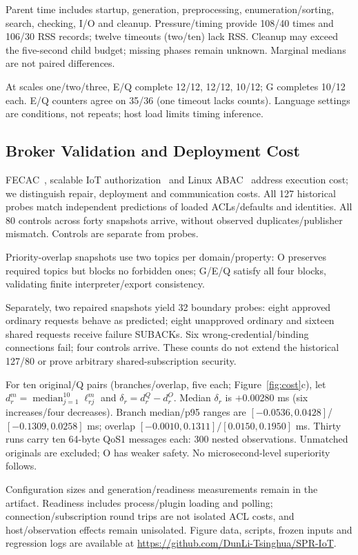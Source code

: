 \documentclass[letterpaper,journal]{IEEEtran}
\begin{document}
Parent time includes startup, generation, preprocessing, enumeration/sorting, search, checking, I/O and cleanup. Pressure/timing provide 108/40 times and 106/30 RSS records; twelve timeouts (two/ten) lack RSS. Cleanup may exceed the five-second child budget; missing phases remain unknown. Marginal medians are not paired differences.

At scales one/two/three, E/Q complete 12/12, 12/12, 10/12; G completes 10/12 each. E/Q counters agree on 35/36 (one timeout lacks counts). Language settings are conditions, not repeats; host load limits timing inference.

\subsection{Broker Validation and Deployment Cost}
FECAC~\cite{fecac}, scalable IoT authorization~\cite{scalable_iot} and Linux ABAC~\cite{linux_abac} address execution cost; we distinguish repair, deployment and communication costs.
All 127 historical probes match independent predictions of loaded ACLs/defaults and identities. All 80 controls across forty snapshots arrive, without observed duplicates/publisher mismatch. Controls are separate from probes.

Priority-overlap snapshots use two topics per domain/property: O preserves required topics but blocks no forbidden ones; G/E/Q satisfy all four blocks, validating finite interpreter/export consistency.

Separately, two repaired snapshots yield 32 boundary probes: eight approved ordinary requests behave as predicted; eight unapproved ordinary and sixteen shared requests receive failure SUBACKs. Six wrong-credential/binding connections fail; four controls arrive. These counts do not extend the historical 127/80 or prove arbitrary shared-subscription security.

For ten original/Q pairs (branches/overlap, five each; Figure~\ref{fig:cost}c), let $d_r^m=\operatorname{median}_{j=1}^{10}\ell_{rj}^{m}$ and $\delta_r=d_r^Q-d_r^O$. Median $\delta_r$ is $+0.00280$ ms (six increases/four decreases). Branch median/p95 ranges are $[-0.0536,0.0428]$/$[-0.1309,0.0258]$ ms; overlap $[-0.0010,0.1311]$/$[0.0150,0.1950]$ ms. Thirty runs carry ten 64-byte QoS1 messages each: 300 nested observations. Unmatched originals are excluded; O has weaker safety. No microsecond-level superiority follows.

Configuration sizes and generation/readiness measurements remain in the artifact. Readiness includes process/plugin loading and polling; connection/subscription round trips are not isolated ACL costs, and host/observation effects remain unisolated.
Figure data, scripts, frozen inputs and regression logs are available at \url{https://github.com/DunLi-Tsinghua/SPR-IoT}.
\end{document}
